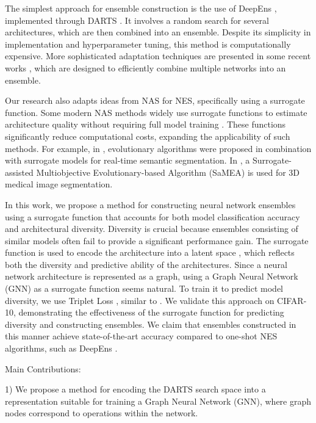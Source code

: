 \documentclass[USenglish]{article}
\theoremstyle{dgthm}
\begin{document}
The simplest approach for ensemble construction is the use of DeepEns \cite{lakshminarayanan2017simple}, implemented through DARTS \cite{Liu2018}. It involves a random search for several architectures, which are then combined into an ensemble. Despite its simplicity in implementation and hyperparameter tuning, this method is computationally expensive. More sophisticated adaptation techniques are presented in some recent works \cite{pmlr-v180-shu22a, Zaidi2021, O_Chen_2021}, which are designed to efficiently combine multiple networks into an ensemble.

Our research also adapts ideas from NAS for NES, specifically using a surrogate function. Some modern NAS methods widely use surrogate functions to estimate architecture quality without requiring full model training \cite{Lu2022, Lu2020, Calisto2021}. These functions significantly reduce computational costs, expanding the applicability of such methods. For example, in \cite{Lu2022}, evolutionary algorithms were proposed in combination with surrogate models for real-time semantic segmentation. In \cite{Calisto2021}, a Surrogate-assisted Multiobjective Evolutionary-based Algorithm (SaMEA) is used for 3D medical image segmentation.

In this work, we propose a method for constructing neural network ensembles using a surrogate function that accounts for both model classification accuracy and architectural diversity. Diversity is crucial because ensembles consisting of similar models often fail to provide a significant performance gain. The surrogate function is used to encode the architecture into a latent space \cite{S_Xue_2024}, which reflects both the diversity and predictive ability of the architectures. Since a neural network architecture is represented as a graph, using a Graph Neural Network (GNN) \cite{Kipf2017} as a surrogate function \cite{wen2020neural} seems natural. To train it to predict model diversity, we use Triplet Loss \cite{schroff2015facenet}, similar to \cite{S_Xue_2024}. We validate this approach on CIFAR-10, demonstrating the effectiveness of the surrogate function for predicting diversity and constructing ensembles. We claim that ensembles constructed in this manner achieve state-of-the-art accuracy compared to one-shot NES algorithms, such as DeepEns \cite{lakshminarayanan2017simple}.

Main Contributions:

1) We propose a method for encoding the DARTS \cite{Liu2018} search space into a representation suitable for training a Graph Neural Network (GNN), where graph nodes correspond to operations within the network.
\end{document}
